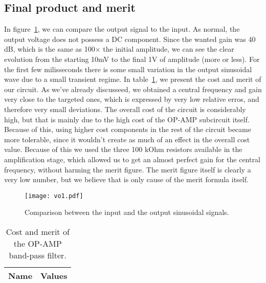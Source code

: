 \subsection{Final product and merit}
In figure~\ref{fig:comp}, we can compare the output signal to the input. As normal, the output voltage does not possess a DC component. Since the wanted gain was 40 dB, which is the same as 100$\times$ the initial amplitude, we can see the clear evolution from the starting 10mV to the final 1V of amplitude (more or less). For the first few milisseconds there is some small variation in the output sinusoidal wave due to a small transient regime.
In table~\ref{tab:merit}, we present the cost and merit of our circuit. As we've already discusseed, we obtained a central frequency and gain very close to the targeted ones, which is expressed by very low relative erros, and therefore very small deviations. The overall cost of the circuit is considerably high, but that is mainly due to the high cost of the OP-AMP subcircuit itself. Because of this, using higher cost components in the rest of the circuit became more tolerable, since it wouldn't create as much of an effect in the overall cost value. Because of this we used the three 100 kOhm resistors available in the amplification stage, which allowed us to get an almost perfect gain for the central frequency, without harming the merit figure. The merit figure itself is clearly a very low number, but we believe that is only cause of the merit formula itself.

\begin{figure}[!h] \centering
\texttt{[image: vo1.pdf]}
\caption{Comparison between the input and the output sinusoidal signals.}
\label{fig:comp}
\end{figure}

\begin{table}[h]
  \centering
  \begin{tabular}{|l|r|}
    \hline    
    {\bf Name} & {\bf Values} \\ \hline
     
  \end{tabular}
  \caption{Cost and merit of the OP-AMP band-pass filter.}
  \label{tab:merit}
\end{table}

\par
